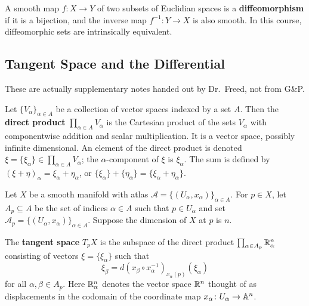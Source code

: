 A smooth map $f \colon X \to Y$ of two subsets of Euclidian spaces is a \textbf{diffeomorphism} if it is a bijection, and the inverse map $f ^{-1} \colon Y \to X$ is also smooth. In this course, diffeomorphic sets are intrinsically equivalent.

\orbreak
\subsection{Tangent Space and the Differential}
These are actually supplementary notes handed out by Dr.\ Freed, not from G\&P.
\begin{definition}
    Let $\{V_{\alpha }\} _{\alpha \in A}$ be a collection of vector spaces indexed by a set $A$. Then the \textbf{direct product} $\prod _{\alpha \in A}V_{\alpha }$ is the Cartesian product of the sets $V_{\alpha }$ with componentwise addition and scalar multiplication. It is a vector space, possibly infinite dimensional. An element of the direct product is denoted $\xi = \{\xi _{\alpha }\} \in  \prod _{\alpha \in A}V_{\alpha }$; the $\alpha $-component of $\xi $ is $\xi _{\alpha }$. The sum is defined by $(\xi + \eta)_{\alpha }=\xi _{\alpha }+\eta _{\alpha }$, or $\{\xi _{\alpha }\} +\{\eta _{\alpha }\} = \{\xi_{\alpha }+\eta _{\alpha }\} $.
\end{definition}
Let $X$ be a smooth manifold with atlas $\mathcal{A} = \{(U_{\alpha },x_{\alpha })\} _{\alpha \in A} $. For $p \in X$, let $A_p\subseteq A$ be the set of indices $\alpha \in A$ such that $p \in U_{\alpha }$ and set $\mathcal{A} _p= \{( U_{\alpha },x _{\alpha })\} _{\alpha \in A}$. Suppose the dimension of $X$ at $p$ is $n$.
\begin{definition}
    The \textbf{tangent space} $T_p X$ is the subspace of the direct product $\prod _{\alpha \in  A_p}\mathbb{R}^n  _{\alpha }$ consisting of vectors $\xi = \{\xi _{\alpha }\} $ such that \[
        \xi _{\beta }= d (x _{\beta }\circ x _{\alpha }^{-1}) _{x _{\alpha }(p)}(\xi _{\alpha })
    \] for all $\alpha ,\beta \in  A_p$. Here $\mathbb{R}^n  _{\alpha }$ denotes the vector space $\mathbb{R}^n $ thought of as displacements in the codomain of the coordinate map $x _{\alpha }\colon  U_{\alpha } \to \mathbb{A}^n $.
\end{definition}
